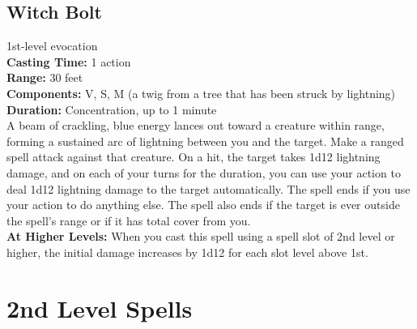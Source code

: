 \documentclass[11pt, A4paper, english]{article}
\begin{document}
		\subsection{Witch Bolt}
1st-level evocation \\
\textbf{Casting Time:} 1 action \\
\textbf{Range:} 30 feet \\
\textbf{Components:} V, S, M (a twig from a tree that has been struck by lightning) \\
\textbf{Duration:} Concentration, up to  1  minute \\
A beam of crackling, blue energy lances out toward a creature within range, forming a sustained arc of lightning between you and the target. Make a ranged spell attack against that creature. On a hit, the target takes  1d12 lightning damage, and on each of your turns for the duration, you can use your action to deal  1d12 lightning damage to the target automatically. The spell ends if you use your action to do anything else. The spell also ends if the target is ever outside the spell’s range or if it has total cover from you. \\
\textbf{At Higher Levels:} When you cast this spell using a spell slot of 2nd level or higher, the initial damage increases by 1d12 for each slot level above 1st.



	\section{2nd Level Spells}
\end{document}
